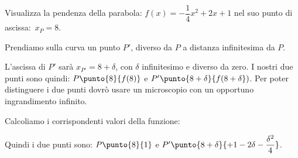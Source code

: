 \begin{esempio}
Visualizza la pendenza della parabola:
\(f(x) = -\dfrac{1}{4}x^2+2x +1\) \quad nel suo punto di ascissa:~\(x_P=8\).

Prendiamo sulla curva un punto \(P'\), diverso da \(P\) a 
distanza infinitesima da \(P\).

L'ascissa di \(P'\) sarà \(x_{P'}=8+\delta\), 
con \(\delta\) infinitesimo e diverso da zero.
I nostri due punti sono quindi:
\(P\punto{8}{f(8)}\) e \(P'\punto{8+\delta}{f(8+\delta})\).
Per poter distinguere i due punti dovrò usare un microscopio con un 
opportuno ingrandimento infinito.

Calcoliamo i corrispondenti valori della funzione:


Quindi i due punti sono:
\(P\punto{8}{1}\) e 
\(P'\punto{8+\delta}{+1 - 2\delta -\dfrac{\delta^2}{4}}\).


\end{esempio}
